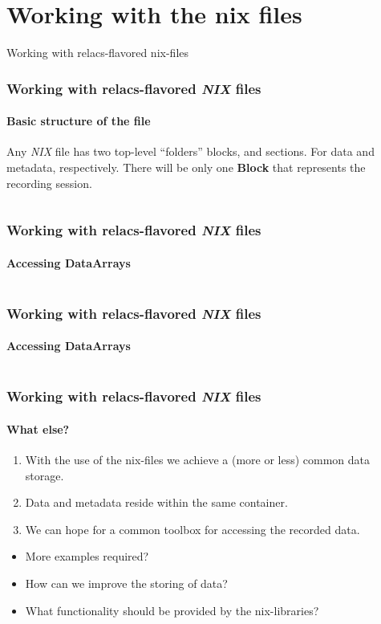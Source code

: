 \documentclass[pdftex, xcolor=table]{beamer}
\newcommand{\rot}[1]{{\color{tug} #1}}
\newcommand{\nix}{\textit{NIX}}
\begin{document}
\section{Working with the nix files}

\begin{frame}
  \huge{\rot{Working with relacs-flavored nix-files}}\\
  \begin{center}
  \end{center}
\end{frame}

\begin{frame}[fragile]
  \frametitle{Working with relacs-flavored \nix{} files}
  \framesubtitle{Basic structure of the file}

  Any \nix{} file has two top-level ``folders'' blocks, and
  sections. For data and metadata, respectively. There will be only one
  \textbf{Block} that represents the recording session.

  \inputminted[bgcolor=lstbg, linenos=false, fontsize=\footnotesize]{bash}{code/open_file.py}
\end{frame}

\begin{frame}[fragile]
  \frametitle{Working with relacs-flavored \nix{} files}
  \framesubtitle{Accessing DataArrays}

  \inputminted[bgcolor=lstbg, linenos=false, fontsize=\footnotesize, firstline=4]{bash}{code/playground1.py}
\end{frame}


\begin{frame}[fragile]
  \frametitle{Working with relacs-flavored \nix{} files}
  \framesubtitle{Accessing DataArrays}

  \inputminted[bgcolor=lstbg, linenos=false, fontsize=\scriptsize, firstline=9, lastline=27]{bash}{code/playground2.py}
\end{frame}


\begin{frame}[fragile]
  \frametitle{Working with relacs-flavored \nix{} files}
  \framesubtitle{What else?}
  \begin{enumerate}
  \item With the use of the nix-files we achieve a (more or less)
    common data storage.
  \item Data and metadata reside within the same container.
  \item We can hope for a common toolbox for accessing the recorded
    data.
  \end{enumerate}

  \begin{itemize}
  \item More examples required?
  \item How can we improve the storing of data?
  \item What functionality should be provided by the nix-libraries?
  \end{itemize}
\end{frame}
\end{document}
